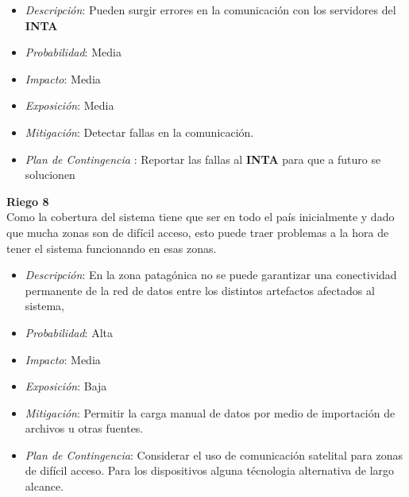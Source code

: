 \begin{itemize}
 \item \textsl{Descripci\'on}: Pueden surgir errores en la comunicaci\'on con los servidores del \textbf{INTA}
 \item \textsl{Probabilidad}: Media
 \item \textsl{Impacto}: Media
 \item \textsl{Exposición}: Media
 \item \textsl{Mitigación}: Detectar fallas en la comunicación.
 \item \textsl{Plan de Contingencia} : Reportar las fallas al \textbf{INTA} para que a futuro se solucionen
\end{itemize}

\textbf{Riego 8}\\
Como la cobertura del sistema tiene que ser en todo el pa\'is inicialmente y dado que mucha zonas son de dif\'icil acceso, esto puede traer problemas a la hora de tener el sistema funcionando en esas zonas.\\

\begin{itemize}
 \item \textsl{Descripci\'on}: En la zona patagónica no se puede garantizar una conectividad permanente de la red de datos entre los distintos artefactos afectados al sistema,
 \item \textsl{Probabilidad}: Alta
 \item \textsl{Impacto}: Media
 \item \textsl{Exposición}: Baja
 \item \textsl{Mitigación}: Permitir la carga manual de datos por medio de importación de archivos u otras fuentes.
 \item \textsl{Plan de Contingencia}: Considerar el uso de comunicaci\'on satelital para zonas de dif\'icil acceso. Para los dispositivos alguna t\'ecnologia alternativa de largo alcance.
\end{itemize}
